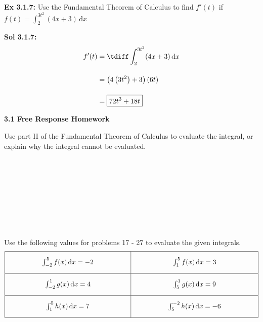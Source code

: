 \begin{tcolorbox}[example]
    \textbf{Ex 3.1.7: } Use the Fundamental Theorem of Calculus to find $f'(t)$ if $f(t) = \int_2^{3t^2} (4x + 3) \,\mathrm{d}x$ 
\end{tcolorbox} 
\begin{tcolorbox}[solution]
    \textbf{Sol 3.1.7: } \begin{align*}
        f'(t) &= \tdiff \int_2^{3t^2} (4x + 3) \,\mathrm{d}x \\[11pt]
        & = \left(4\left(3t^2\right) + 3\right)(6t) \\[11pt]
        & = \boxed{72t^3 + 18t}
    \end{align*}
\end{tcolorbox}

\newpage

\textbf{\large{3.1 Free Response Homework}} \par

Use part II of the Fundamental Theorem of Calculus to evaluate the integral, or explain why the integral cannot be evaluated. \par

 \\[11pt]
 \\[11pt]
 \\[11pt]
 \\[11pt]
 \\[11pt]
 \\[11pt]
 \\[11pt]
 \\[11pt]

Use the following values for problems 17 - 27 to evaluate the given integrals. \begin{align*}
    \arraycolsep=55pt\def\arraystretch{2.2} 
    \begin{array}[c]{|c|c|}
        \hline
        \int_{-2}^5 f(x) \,\mathrm{d}x = -2 & \int_1^5 f(x) \,\mathrm{d}x = 3 \\[5.5pt] \hline
        \int_{-2}^1 g(x) \,\mathrm{d}x = 4 & \int_5^1 g(x) \,\mathrm{d}x = 9 \\[5.5pt] \hline
        \int_1^5 h(x) \,\mathrm{d}x = 7 & \int_5^{-2} h(x) \,\mathrm{d}x = -6 \\[5.5pt] 
        \hline
    \end{array}
\end{align*}

